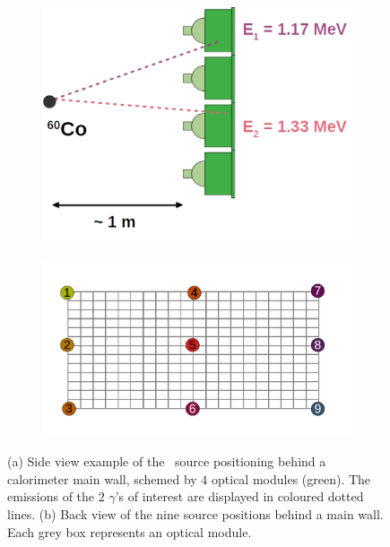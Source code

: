 \begin{figure}[h]
  \centering
  \begin{subfigure}[t]{0.48\textwidth}
    \centering
    \includegraphics[height=0.7\textwidth]{commissioning/fig_commissioning/Co_setup.pdf}
    \captionsetup{justification=justified}
    \caption{
      \label{subfig:Co_setup}}
  \end{subfigure}
  \hfill
  \begin{subfigure}[t]{0.48\textwidth}
    \centering
    \includegraphics[height=0.7\textwidth]{commissioning/fig_commissioning/Co_setup_wall.pdf}
    \captionsetup{justification=justified}
    \caption{
      \label{subfig:Co_setup_wall}}
  \end{subfigure}
  \caption{(a) Side view example of the \Co\ source positioning behind a calorimeter main wall, schemed by $4$ optical modules (green).
    The emissions of the $2$ $\gamma$'s of interest are displayed in coloured dotted lines.
    (b) Back view of the nine source positions behind a main wall.
    Each grey box represents an optical module.
    \label{fig:Co_exp_design}
  }
\end{figure}

